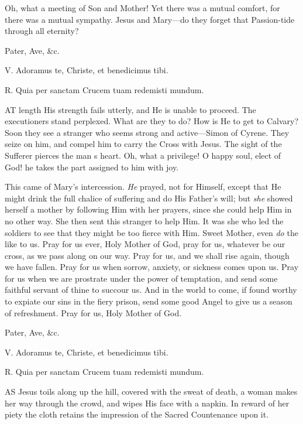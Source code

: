 Oh, what a meeting of Son and
Mother! Yet there was a mutual comfort, for there was a mutual sympathy.
Jesus and Mary—do they forget that Passion-tide through all eternity?

Pater, Ave, \&c.


V. Adoramus te, Christe, et
benedicimus tibi.

R. Quia per sanctam Crucem tuam redemisti mundum.

AT length His
strength fails utterly, and He is unable to proceed. The executioners
stand perplexed. What are they to do? How is He to get to Calvary? Soon
they see a stranger who seems strong and active—Simon of Cyrene. They
seize on him, and compel him to carry the Cross with Jesus. The sight of
the Sufferer pierces the man s heart. Oh, what a privilege! O happy
soul, elect of God! he takes the part assigned to him with joy.

This came of Mary's
intercession. \emph{He} prayed, not for Himself, except that He might
drink the full chalice of suffering and do His Father's will; but \emph{she}
showed herself a mother by following Him with her prayers, since she
could help Him in no other way. She then sent this stranger to help Him.
It was she who led the soldiers to see that they might be too fierce
with Him. Sweet Mother, even \emph{do} the like to us. Pray for us ever,
Holy Mother of God, pray for us, whatever be our cross, as we pass along
on our way. Pray for us, and we shall rise again, though we have fallen.
Pray for us when sorrow, anxiety, or sickness comes upon us. Pray for us
when we are prostrate under the power of temptation, and send some
faithful servant of thine to succour us. And in the world to come, if
found worthy to expiate our sins in the fiery prison, send some good
Angel to give us a season of refreshment. Pray for us, Holy Mother of
God.

Pater, Ave, \&c.


V. Adoramus te, Christe, et
benedicimus tibi.

R. Quia per sanctam Crucem tuam redemisti mundum.

AS Jesus toils along
up the hill, covered with the sweat of death, a woman makes her way
through the crowd, and wipes His face with a napkin. In reward of her
piety the cloth retains the impression of the Sacred Countenance upon
it.

